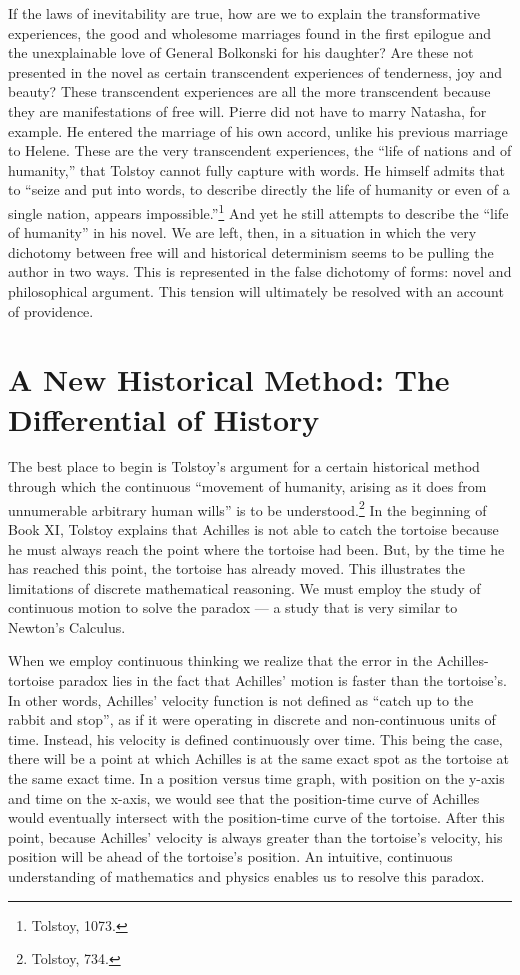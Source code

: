 \documentclass[12pt]{article}
\begin{document}
If the laws of inevitability are true, how are we to explain the transformative experiences, the good and wholesome marriages found in the first epilogue and the unexplainable love of General Bolkonski for his daughter? Are these not presented in the novel as certain transcendent experiences of tenderness, joy and beauty? These transcendent experiences are all the more transcendent because they are manifestations of free will. Pierre did not have to marry Natasha, for example. He entered the marriage of his own accord, unlike his previous marriage to Helene. These are the very transcendent experiences, the ``life of nations and of humanity,'' that Tolstoy cannot fully capture with words. He himself admits that to ``seize and put into words, to describe directly the life of humanity or even of a single nation, appears impossible.''\footnote{Tolstoy, 1073.} And yet he still attempts to describe the ``life of humanity'' in his novel. We are left, then, in a situation in which the very dichotomy between free will and historical determinism seems to be pulling the author in two ways. This is represented in the false dichotomy of forms: novel and philosophical argument. This tension will ultimately be resolved with an account of providence.

\section{A New Historical Method: The Differential of \mbox{History}}
The best place to begin is Tolstoy's argument for a certain historical method through which the continuous ``movement of humanity, arising as it does from unnumerable arbitrary human wills'' is to be understood.\footnote{Tolstoy, 734.} In the beginning of Book XI, Tolstoy explains that Achilles is not able to catch the tortoise because he must always reach the point where the tortoise had been. But, by the time he has reached this point, the tortoise has already moved. This illustrates the limitations of discrete mathematical reasoning. We must employ the study of continuous motion to solve the paradox --- a study that is very similar to Newton's Calculus.

When we employ continuous thinking we realize that the error in the Achilles-tortoise paradox lies in the fact that Achilles' motion is faster than the tortoise's. In other words, Achilles' velocity function is not defined as ``catch up to the rabbit and stop'', as if it were operating in discrete and non-continuous units of time. Instead, his velocity is defined continuously over time. This being the case, there will be a point at which Achilles is at the same exact spot as the tortoise at the same exact time. In a position versus time graph, with position on the y-axis and time on the x-axis, we would see that the position-time curve of Achilles would eventually intersect with the position-time curve of the tortoise. After this point, because Achilles' velocity is always greater than the tortoise's velocity, his position will be ahead of the tortoise's position. An intuitive, continuous understanding of mathematics and physics enables us to resolve this paradox.
\end{document}
